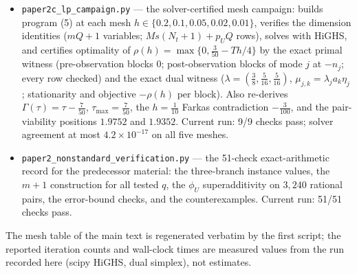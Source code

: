 \documentclass[10pt,article]{article}
\begin{document}
\begin{itemize}\tightlist
\item \texttt{paper2c\_lp\_campaign.py} --- the solver-certified mesh
campaign: builds program (5) at each mesh \(h \in \{0.2, 0.1, 0.05, 0.02,
0.01\}\), verifies the dimension identities (\(mQ{+}1\) variables;
\(Ms(N_t{+}1) + p_U Q\) rows), solves with HiGHS, and certifies optimality of
\(\rho(h) = \max\{0, \tfrac{3}{50} - Th/4\}\) by the exact primal witness
(pre-observation blocks \(0\); post-observation blocks of mode \(j\) at
\(-n_j\); every row checked) and the exact dual witness
(\(\lambda = (\tfrac38, \tfrac5{16}, \tfrac5{16})\),
\(\mu_{j,k} = \lambda_j a_k \eta_j\); stationarity and objective \(-\rho(h)\)
per block). Also re-derives \(\Gamma(\tau) = \tau - \tfrac7{50}\),
\(\tau_{\max} = \tfrac7{50}\), the \(h = \tfrac1{10}\) Farkas contradiction
\(-\tfrac3{100}\), and the pair-viability positions \(1.9752\) and
\(1.9352\). Current run: 9/9 checks pass; solver agreement at most
\(4.2 \times 10^{-17}\) on all five meshes.
\item \texttt{paper2\_nonstandard\_verification.py} --- the 51-check
exact-arithmetic record for the predecessor material: the three-branch
instance values, the \(m+1\) construction for all tested \(q\), the
\(\phi_U\) superadditivity on \(3{,}240\) rational pairs, the error-bound
checks, and the counterexamples. Current run: 51/51 checks pass.
\end{itemize}

The mesh table of the main text is regenerated verbatim by the first script;
the reported iteration counts and wall-clock times are measured values from
the run recorded here (scipy HiGHS, dual simplex), not estimates.
\end{document}
